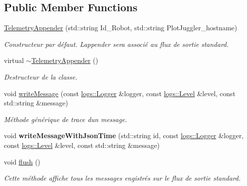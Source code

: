 \subsection*{Public Member Functions}
\begin{DoxyCompactItemize}
\item 
\mbox{\label{classlogs_1_1TelemetryAppender_af3e00020871557769a6036e49cf0903f}} 
\hyperlink{classlogs_1_1TelemetryAppender_af3e00020871557769a6036e49cf0903f}{Telemetry\+Appender} (std\+::string Id\+\_\+\+Robot, std\+::string Plot\+Juggler\+\_\+hostname)
\begin{DoxyCompactList}\small\item\em Constructeur par défaut. L\textquotesingle{}appender sera associé au flux de sortie standard. \end{DoxyCompactList}\item 
\mbox{\label{classlogs_1_1TelemetryAppender_a0f37f1968d5db9221fb33631729fbb0a}} 
virtual \hyperlink{classlogs_1_1TelemetryAppender_a0f37f1968d5db9221fb33631729fbb0a}{$\sim$\+Telemetry\+Appender} ()
\begin{DoxyCompactList}\small\item\em Destructeur de la classe. \end{DoxyCompactList}\item 
void \hyperlink{classlogs_1_1TelemetryAppender_ac016e9912989d9550e5f5b42603a793c}{write\+Message} (const \hyperlink{classlogs_1_1Logger}{logs\+::\+Logger} \&logger, const \hyperlink{classlogs_1_1Level}{logs\+::\+Level} \&level, const std\+::string \&message)
\begin{DoxyCompactList}\small\item\em Méthode générique de trace d\textquotesingle{}un message. \end{DoxyCompactList}\item 
\mbox{\label{classlogs_1_1TelemetryAppender_a2021f9d6001dc21de8abb6f7dffce234}} 
void {\bfseries write\+Message\+With\+Json\+Time} (std\+::string id, const \hyperlink{classlogs_1_1Logger}{logs\+::\+Logger} \&logger, const \hyperlink{classlogs_1_1Level}{logs\+::\+Level} \&level, const std\+::string \&message)
\item 
\mbox{\label{classlogs_1_1TelemetryAppender_a70d4527e81e59cb89832f0ceb2cc5edb}} 
void \hyperlink{classlogs_1_1TelemetryAppender_a70d4527e81e59cb89832f0ceb2cc5edb}{flush} ()
\begin{DoxyCompactList}\small\item\em Cette méthode affiche tous les messages engistrés sur le flux de sortie standard. \end{DoxyCompactList}\end{DoxyCompactItemize}
